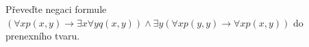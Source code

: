 \subsubsection{}
Převeďte negaci formule $(\forall x p(x,y) \rightarrow \exists x \forall y
q(x,y)) \wedge  \exists y (\forall x p(y,y) \rightarrow \forall x p(x,y))$ do
prenexního tvaru.
